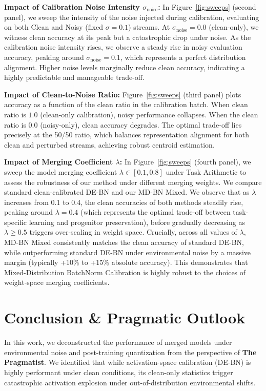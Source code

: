 \documentclass{article}
\theoremstyle{plain}
\theoremstyle{definition}
\theoremstyle{remark}
\begin{document}
\textbf{Impact of Calibration Noise Intensity $\sigma_{\text{noise}}$:} In Figure~\ref{fig:sweeps} (second panel), we sweep the intensity of the noise injected during calibration, evaluating on both Clean and Noisy (fixed $\sigma=0.1$) streams. At $\sigma_{\text{noise}} = 0.0$ (clean-only), we witness clean accuracy at its peak but a catastrophic drop under noise. As the calibration noise intensity rises, we observe a steady rise in noisy evaluation accuracy, peaking around $\sigma_{\text{noise}} = 0.1$, which represents a perfect distribution alignment. Higher noise levels marginally reduce clean accuracy, indicating a highly predictable and manageable trade-off.

\textbf{Impact of Clean-to-Noise Ratio:} Figure~\ref{fig:sweeps} (third panel) plots accuracy as a function of the clean ratio in the calibration batch. When clean ratio is $1.0$ (clean-only calibration), noisy performance collapses. When the clean ratio is $0.0$ (noisy-only), clean accuracy degrades. The optimal trade-off lies precisely at the 50/50 ratio, which balances representation alignment for both clean and perturbed streams, achieving robust centroid estimation.

\textbf{Impact of Merging Coefficient $\lambda$:} In Figure~\ref{fig:sweeps} (fourth panel), we sweep the model merging coefficient $\lambda \in [0.1, 0.8]$ under Task Arithmetic to assess the robustness of our method under different merging weights. We compare standard clean-calibrated DE-BN and our MD-BN Mixed. We observe that as $\lambda$ increases from 0.1 to 0.4, the clean accuracies of both methods steadily rise, peaking around $\lambda=0.4$ (which represents the optimal trade-off between task-specific learning and progenitor preservation), before gradually decreasing as $\lambda \ge 0.5$ triggers over-scaling in weight space. Crucially, across all values of $\lambda$, MD-BN Mixed consistently matches the clean accuracy of standard DE-BN, while outperforming standard DE-BN under environmental noise by a massive margin (typically +10\% to +15\% absolute accuracy). This demonstrates that Mixed-Distribution BatchNorm Calibration is highly robust to the choices of weight-space merging coefficients.

\section{Conclusion \& Pragmatic Outlook}
\label{sec:conclusion}
In this work, we deconstructed the performance of merged models under environmental noise and post-training quantization from the perspective of \textbf{The Pragmatist}. We identified that while activation-space calibration (DE-BN) is highly performant under clean conditions, its clean-only statistics trigger catastrophic activation explosion under out-of-distribution environmental shifts.
\end{document}
